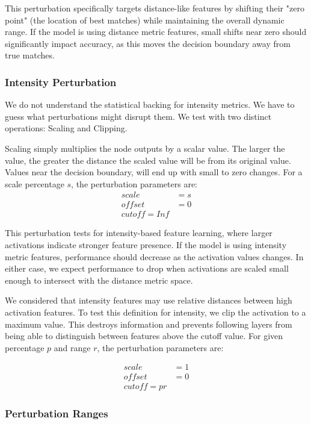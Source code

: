 This perturbation specifically targets distance-like features by shifting their "zero point" (the location of best matches) while maintaining the overall dynamic range. If the model is using distance metric features, small shifts near zero should significantly impact accuracy, as this moves the decision boundary away from true matches.

\subsubsection{Intensity Perturbation}
We do not understand the statistical backing for intensity metrics. We have to guess what perturbations might disrupt them. We test with two distinct operations: Scaling and Clipping.

Scaling simply multiplies the node outputs by a scalar value. The larger the value, the greater the distance the scaled value will be from its original value. Values near the decision boundary, will end up with small to zero changes. For a scale percentage $s$, the perturbation parameters are:
\begin{align}
    scale &= s \\
    offset &= 0 \\
    cutoff = Inf
\end{align}

This perturbation tests for intensity-based feature learning, where larger activations indicate stronger feature presence. If the model is using intensity metric features, performance should decrease as the activation values changes. In either case, we expect performance to drop when activations are scaled small enough to intersect with the distance metric space.

We considered that intensity features may use relative distances between high activation features. To test this definition for intensity, we clip the activation to a maximum value. This destroys information and prevents following layers from being able to distinguish between features above the cutoff value. For given percentage $p$ and range $r$, the perturbation parameters are:

\begin{align}
    scale &= 1 \\
    offset &= 0 \\
    cutoff = p r
\end{align}

\subsubsection{Perturbation Ranges}

